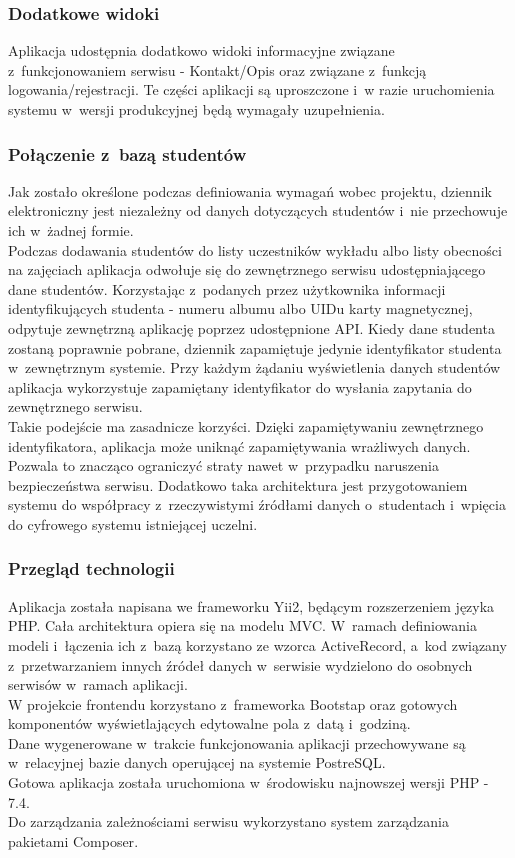 \documentclass[declaration,shortabstract, mgr]{iithesis}
\begin{document}
\subsubsection{Dodatkowe widoki}
\indent Aplikacja udostępnia dodatkowo widoki informacyjne związane z~funkcjonowaniem serwisu - Kontakt/Opis oraz związane z~funkcją logowania/rejestracji. Te części aplikacji są uproszczone i~w razie uruchomienia systemu w~wersji produkcyjnej będą wymagały uzupełnienia.

\subsubsection{Połączenie z~bazą studentów}
\indent Jak zostało określone podczas definiowania wymagań wobec projektu, dziennik elektroniczny jest niezależny od danych dotyczących studentów i~nie przechowuje ich w~żadnej formie.\\
\indent Podczas dodawania studentów do listy uczestników wykładu albo listy obecności na zajęciach aplikacja odwołuje się do zewnętrznego serwisu udostępniającego dane studentów. Korzystając z~podanych przez użytkownika informacji identyfikujących studenta - numeru albumu albo UIDu karty magnetycznej, odpytuje zewnętrzną aplikację poprzez udostępnione API. Kiedy dane studenta zostaną poprawnie pobrane, dziennik zapamiętuje jedynie identyfikator studenta w~zewnętrznym systemie. Przy każdym żądaniu wyświetlenia danych studentów aplikacja wykorzystuje zapamiętany identyfikator do wysłania zapytania do zewnętrznego serwisu. \\
\indent Takie podejście ma zasadnicze korzyści. Dzięki zapamiętywaniu zewnętrznego identyfikatora, aplikacja może uniknąć zapamiętywania wrażliwych danych. Pozwala to znacząco ograniczyć straty nawet w~przypadku naruszenia bezpieczeństwa serwisu. Dodatkowo taka architektura jest przygotowaniem systemu do współpracy z~rzeczywistymi źródłami danych o~studentach i~wpięcia do cyfrowego systemu istniejącej uczelni.\\
\subsubsection{Przegląd technologii}
\indent Aplikacja została napisana we frameworku Yii2\cite{yii}, będącym rozszerzeniem języka PHP. Cała architektura opiera się na modelu MVC. W~ramach definiowania modeli i~łączenia ich z~bazą korzystano ze wzorca ActiveRecord, a~kod związany z~przetwarzaniem innych źródeł danych w~serwisie wydzielono do osobnych serwisów w~ramach aplikacji.\\
\indent W projekcie frontendu korzystano z~frameworka Bootstap\cite{bootstrap} oraz gotowych komponentów\cite{kartik}\cite{da1}\cite{da2} wyświetlających edytowalne pola z~datą i~godziną. \\
\indent Dane wygenerowane w~trakcie funkcjonowania aplikacji przechowywane są w~relacyjnej bazie danych operującej na systemie PostreSQL\cite{psql}.\\
\indent Gotowa aplikacja została uruchomiona w~środowisku najnowszej wersji PHP - 7.4.\\
\indent Do zarządzania zależnościami serwisu wykorzystano system zarządzania pakietami Composer\cite{composer}.
\end{document}
